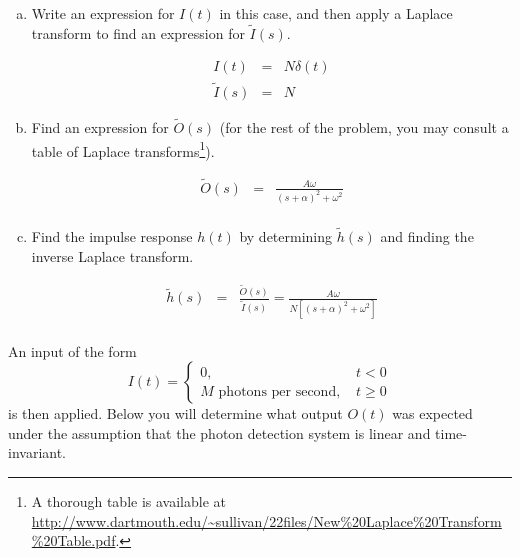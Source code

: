 \documentclass{article}
\begin{document}
   \begin{enumerate}[a)]
\setlength{\itemsep}{0pt}
\setcounter{enumi}{2}
\item Write an expression for $I(t)$ in this case, and then apply a Laplace transform to find an expression for $\tilde{I}(s)$.

{\color{red}
\begin{eqnarray*}
 I(t) & = & N \delta(t)\\
 \tilde{I}(s) & = & N
 \end{eqnarray*}
}


\item Find an expression for $\tilde{O}(s)$ (for the rest of the problem, you may consult a table of Laplace transforms\footnote{A thorough table is available at \url{http://www.dartmouth.edu/\~sullivan/22files/New\%20Laplace\%20Transform\%20Table.pdf}.}). 

{\color{red}
\begin{eqnarray*}
 \tilde{O}(s) & = & \frac{A \omega}{\left(s + \alpha \right)^2 + \omega^2} \\
 \end{eqnarray*}
}

\item Find the impulse response $h(t)$ by determining $\tilde{h}(s)$ and finding the inverse Laplace transform.

{\color{red}
\begin{eqnarray*}
 \tilde{h}(s) & = & \frac{\tilde{O}(s)}{\tilde{I}(s)} = \frac{A \omega}{N \left[ \left(s + \alpha \right)^2 + \omega^2 \right]} \\
 \end{eqnarray*}
}


\end{enumerate}
An input of the form
\[ I(t) = \left\{
     \begin{array}{lr}
       0, & t < 0 \\
      M \textrm{ photons per second, } & t \geq 0
     \end{array}
   \right. \]      
is then applied. Below you will determine what output $O(t)$ was expected under the assumption that the photon detection system is linear and time-invariant.
\end{document}
